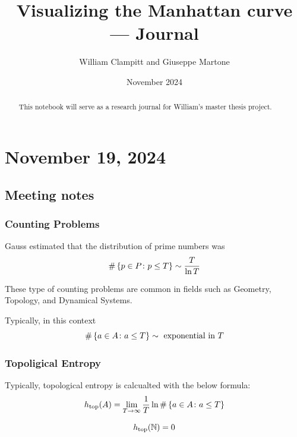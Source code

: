 \documentclass{amsart}
\title{Visualizing the Manhattan curve --- Journal}
\author{William Clampitt and Giuseppe Martone}
\date{November 2024}
\begin{document}
\begin{abstract}
    This notebook will serve as a research journal for William's master thesis project.
\end{abstract}

\maketitle
\tableofcontents

\section{November 19, 2024}

\subsection{Meeting notes}

\subsubsection{Counting Problems}
	Gauss estimated that the distribution of prime numbers was 
	\begin{equation*}
		\# \left\{p \in P \colon p \leq T\right\} \sim \frac{T}{\ln T} 
	\end{equation*}
	
	These type of counting problems are common in fields such as Geometry, Topology, and Dynamical Systems. 
	
	Typically, in this context
	\begin{equation*}
		\# \left\{ a \in A \colon a \leq T\right\} \sim \text{ exponential in } T
	\end{equation*}
	
	\subsubsection*{Topoligical Entropy}
	Typically, topological entropy is calcualted with the below formula:
	\begin{equation*}
		h_{\text{top}}(A) = \lim_{T \to \infty} \frac{1}{T} \ln \# \left\{a \in A \colon a \leq T\right\}
	\end{equation*}
	
	\begin{example*}
		\begin{equation*}
			h_{\text{top}}(\mathbb{N}) = 0
		\end{equation*}
	\end{example*}
	
\end{document}
